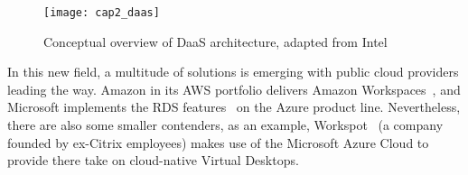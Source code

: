 \begin{description}
		\begin{figure}[htbp]
			\centering
			\texttt{[image: cap2\_daas]}
			\caption{Conceptual overview of DaaS architecture, adapted from Intel~\cite{Jain2014}}
			\label{fig:daas}
		\end{figure}

		In this new field, a multitude of solutions is emerging with public cloud providers leading the way. Amazon in its AWS portfolio delivers Amazon Workspaces~\cite{aws_workspaces}, and Microsoft implements the RDS features~\cite{azure_rds} on the Azure product line. Nevertheless, there are also some smaller contenders, as an example, Workspot~\cite{workspot} (a company founded by ex-Citrix employees) makes use of the Microsoft Azure Cloud to provide there take on cloud-native Virtual Desktops.
\end{description}


